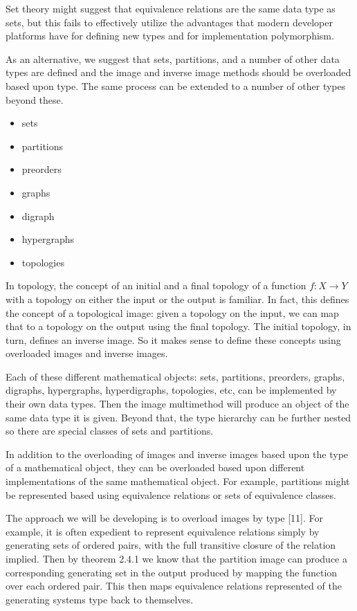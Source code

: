 \documentclass[a4paper,11pt, notitlepage]{report}
\theoremstyle{definition}
\begin{document}
Set theory might suggest that equivalence relations are the same data type as sets, but this fails to effectively utilize the advantages that modern developer platforms have for defining new types and for implementation polymorphism.

As an alternative, we suggest that sets, partitions, and a number of other data types are defined and the image and inverse image methods should be overloaded based upon type. The same process can be extended to a number of other types beyond these.

\begin{itemize}
 \item sets
 \item partitions
 \item preorders
 \item graphs
 \item digraph
 \item hypergraphs
 \item topologies
\end{itemize}

In topology, the concept of an initial and a final topology of a function $f: X \to Y$ with a topology on either the input or the output is familiar. In fact, this defines the concept of a topological image: given a topology on the input, we can map that to a topology on the output using the final topology. The initial topology, in turn, defines an inverse image. So it makes sense to define these concepts using overloaded images and inverse images.

\newpage

Each of these different mathematical objects: sets, partitions, preorders, graphs, digraphs, hypergraphs, hyperdigraphs, topologies, etc, can be implemented by their own data types. Then the image multimethod will produce an object of the same data type it is given. Beyond that, the type hierarchy can be further nested so there are special classes of sets and partitions.

In addition to the overloading of images and inverse images based upon the type of a mathematical object, they can be overloaded based upon different implementations of the same mathematical object. For example, partitions might be represented based using equivalence relations or sets of equivalence classes.

The approach we will be developing is to overload images by type [11]. For example, it is often expedient to represent equivalence relations simply by generating sets of ordered pairs, with the full transitive closure of the relation implied. Then by theorem 2.4.1 we know that the partition image can produce a corresponding generating set in the output produced by mapping the function over each ordered pair. This then maps equivalence relations represented of the generating systems type back to themselves.
\end{document}
